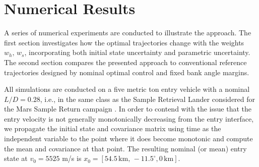 \documentclass[journal ]{new-aiaa}
\begin{document}
%
%

\section*{Numerical Results}
A series of numerical experiments are conducted to illustrate the approach. The first section investigates how the optimal trajectories change with the weights $w_h,\,w_s$, incorporating both initial state uncertainty and parametric uncertainty. The second section compares the presented approach to conventional reference trajectories designed by nominal optimal control and fixed bank angle margins. 

All simulations are conducted on a five metric ton entry vehicle with a nominal $L/D=0.28$, i.e., in the same class as the Sample Retrieval Lander considered for the Mars Sample Return campaign \cite{MSR}. In order to contend with the issue that the entry velocity is not generally monotonically decreasing from the entry interface, we propagate the initial state and covariance matrix using time as the independent variable to the point where it does become monotonic and compute the mean and covariance at that point. The resulting nominal (or mean) entry state at $v_0 = 5525$ m/s is $x_0 = [54.5\,\mathrm{km},\,-11.5^{\circ}, 0\,\mathrm{km}]$.
\end{document}
